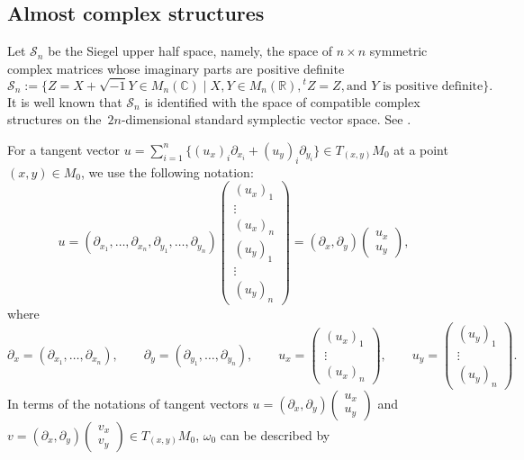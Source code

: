 \documentclass[pdftex]{sigma}
\numberwithin{equation}{section}
\newcommand{\C}{\mathbb{C}}
\newcommand{\R}{\mathbb{R}}
\begin{document}
\subsection{Almost complex structures}
Let ${\mathcal S}_n$ be the Siegel upper half space, namely, the space of $n\times n$ symmetric complex matrices whose imaginary parts are positive definite
\[
{\mathcal S}_n:=\big\{ Z=X+\sqrt{-1}Y\in M_n(\C)\mid X, Y\in M_n(\R), {}^tZ=Z, \text{and }Y\text{ is positive definite} \big\} .
\]
It is well known that ${\mathcal S}_n$ is identified with the space of compatible complex structures on the~$2n$-dimensional standard symplectic vector space. See \cite[Chapter II, Section~4]{Mumford1}.

For a tangent vector $u=\sum_{i=1}^n \{(u_x)_i\partial_{x_i}+(u_y)_i\partial_{y_i} \}\in T_{(x,y)}M_0$ at a point $(x,y)\in M_0$, we use the following notation:
\[
u
= (\partial_{x_1},\ldots, \partial_{x_n}, \partial_{y_1},\ldots, \partial_{y_n} )
\begin{pmatrix}
(u_x)_1 \\
\vdots \\
(u_x)_n \\
(u_y)_1\\
\vdots \\
(u_y)_n
\end{pmatrix}
=(\partial_x, \partial_y)
\begin{pmatrix}
u_x \\
u_y
\end{pmatrix},
\]
where
\[
\partial_x=(\partial_{x_1},\ldots, \partial_{x_n}),\qquad \partial_y=(\partial_{y_1},\ldots, \partial_{y_n}),\qquad
u_x=
\begin{pmatrix}
(u_x)_1\\
\vdots \\
(u_x)_n
\end{pmatrix},\qquad
u_y=
\begin{pmatrix}
(u_y)_1\\
\vdots\\
(u_y)_n
\end{pmatrix}.
\]
In terms of the notations of tangent vectors
$u=(\partial_x, \partial_y)
\left(\begin{smallmatrix}
u_x \\
u_y
\end{smallmatrix}\right)$
and
$v=(\partial_x, \partial_y)
\left(\begin{smallmatrix}
v_x \\
v_y
\end{smallmatrix}\right)\in T_{(x,y)}M_0$, $\omega_0$ can be described by
\end{document}
